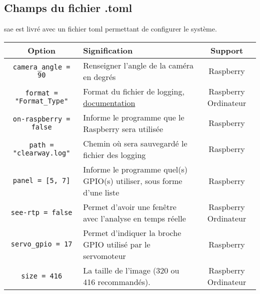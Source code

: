 \subsection{Champs du fichier .toml}
\label{sec:executionTOML_clearWay}
\gls{sae} est livré avec un fichier toml permettant de configurer le système.
\begin{table}[H]
    \centering
    \begin{tabularx}{\linewidth}{|c|X|c|}
        \hline
        \rowcolor{tableColorDark} Option        & Signification                                                                                                                & Support              \\
        \hline
        \texttt{camera\_angle = 90}             & Renseigner l'angle de la caméra en degrés                                                                                    & Raspberry            \\\hline
        \texttt{format = "Format\_Type"}        & Format du fichier de logging, \href{https://docs.python.org/3/howto/logging-cookbook.html\#formatting-styles}{documentation} & Raspberry Ordinateur \\\hline
        \texttt{on-raspberry = false}           & Informe le programme que le Raspberry sera utilisée                                                                          & Raspberry            \\\hline
        \texttt{path = "clearway.log"}          & Chemin où sera sauvegardé le fichier des logging                                                                             & Raspberry            \\\hline
        \texttt{panel = [5, 7]}                 & Informe le programme quel(s) GPIO(s) utiliser, sous forme d'une liste                                                        & Raspberry            \\\hline
        \texttt{see-rtp = false}                & Permet d'avoir une fenêtre avec l'analyse en temps réelle                                                                    & Raspberry Ordinateur \\\hline
        \texttt{servo\_gpio = 17}               & Permet d'indiquer la broche GPIO utilisé par le servomoteur                                                                  & Raspberry            \\\hline
        \texttt{size = 416}                     & La taille de l'image (320 ou 416 recommandés).                                                                               & Raspberry Ordinateur \\\hline

\end{tabularx}
\end{table}
